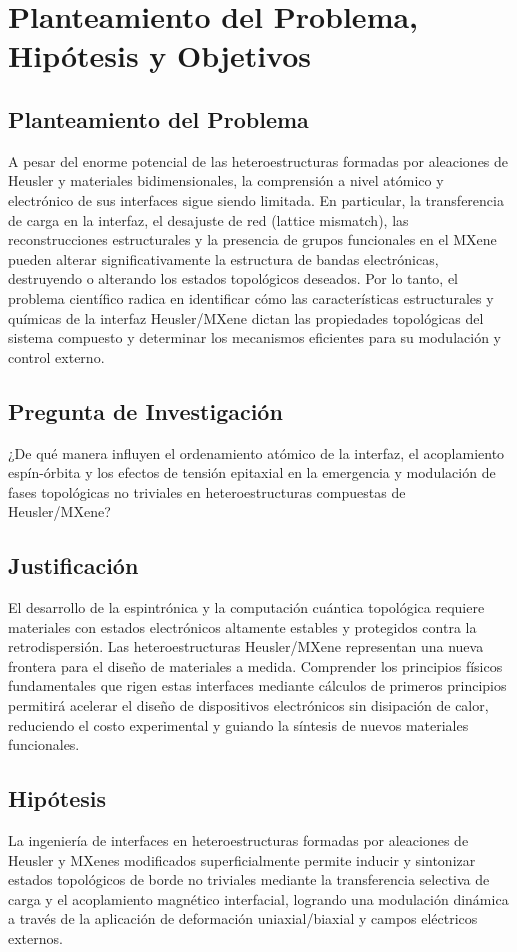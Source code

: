 \section{Planteamiento del Problema, Hipótesis y Objetivos}
\label{sec:planteamiento}

\subsection{Planteamiento del Problema}
A pesar del enorme potencial de las heteroestructuras formadas por aleaciones de Heusler y materiales bidimensionales, la comprensión a nivel atómico y electrónico de sus interfaces sigue siendo limitada. En particular, la transferencia de carga en la interfaz, el desajuste de red (lattice mismatch), las reconstrucciones estructurales y la presencia de grupos funcionales en el MXene pueden alterar significativamente la estructura de bandas electrónicas, destruyendo o alterando los estados topológicos deseados. Por lo tanto, el problema científico radica en identificar cómo las características estructurales y químicas de la interfaz Heusler/MXene dictan las propiedades topológicas del sistema compuesto y determinar los mecanismos eficientes para su modulación y control externo.

\subsection{Pregunta de Investigación}
¿De qué manera influyen el ordenamiento atómico de la interfaz, el acoplamiento espín-órbita y los efectos de tensión epitaxial en la emergencia y modulación de fases topológicas no triviales en heteroestructuras compuestas de Heusler/MXene?

\subsection{Justificación}
El desarrollo de la espintrónica y la computación cuántica topológica requiere materiales con estados electrónicos altamente estables y protegidos contra la retrodispersión. Las heteroestructuras Heusler/MXene representan una nueva frontera para el diseño de materiales a medida. Comprender los principios físicos fundamentales que rigen estas interfaces mediante cálculos de primeros principios permitirá acelerar el diseño de dispositivos electrónicos sin disipación de calor, reduciendo el costo experimental y guiando la síntesis de nuevos materiales funcionales.

\subsection{Hipótesis}
La ingeniería de interfaces en heteroestructuras formadas por aleaciones de Heusler y MXenes modificados superficialmente permite inducir y sintonizar estados topológicos de borde no triviales mediante la transferencia selectiva de carga y el acoplamiento magnético interfacial, logrando una modulación dinámica a través de la aplicación de deformación uniaxial/biaxial y campos eléctricos externos.


